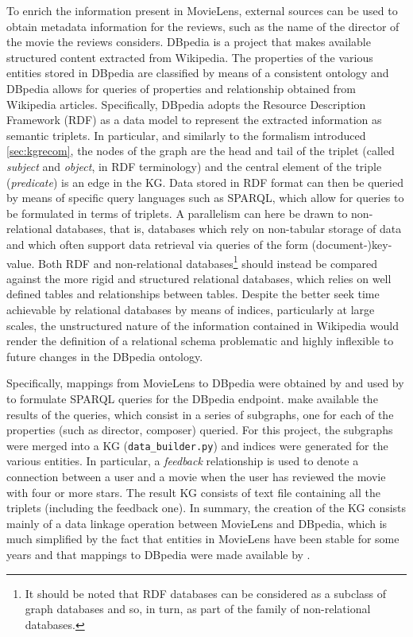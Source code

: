 To enrich the information present in MovieLens, external sources can be used to obtain metadata information for the reviews, such as the name of the director of the movie the reviews considers.
DBpedia \parencite{auer2007dbpedia} is a project that makes available structured  content extracted from Wikipedia.
The properties of the various entities stored in DBpedia are classified by means of a consistent ontology and DBpedia allows for queries of properties and relationship obtained from Wikipedia articles.
Specifically, DBpedia adopts the Resource Description Framework (RDF) as a data model to represent the extracted information as semantic triplets.
In particular, and similarly to the formalism introduced \cref{sec:kgrecom}, the nodes of the graph are the head and tail of the triplet (called \emph{subject} and \emph{object}, in RDF terminology) and the central element of the triple (\emph{predicate}) is an edge in the KG.
Data stored in RDF format can then be queried by means of specific query languages such as SPARQL, which allow for queries to be formulated in terms of triplets.
A parallelism can here be drawn to non-relational databases, that is, databases which rely on non-tabular storage of data and which often support data retrieval via queries of the form (document-)key-value.
Both RDF and non-relational databases\footnote{It should be noted that RDF databases can be considered as a subclass of graph databases and so, in turn, as part of the family of non-relational databases.} should instead be compared against the more rigid and structured relational databases, which relies on well defined tables and relationships between tables.
Despite the better seek time achievable by relational databases by means of indices, particularly at large scales, the unstructured nature of the information contained in Wikipedia would render the definition of a relational schema problematic and highly inflexible to future changes in the DBpedia ontology. 

Specifically, mappings  from MovieLens to DBpedia were obtained by \cite{ostuni2013top} and used by \cite{palumbo2017entity2rec} to formulate SPARQL queries for the DBpedia endpoint.
\cite{palumbo2017entity2rec} make available the results of the queries, which consist in a series of subgraphs, one for each of the properties (such as director, composer) queried.
For this project, the subgraphs were merged into a KG (\texttt{data\_builder.py}) and indices were generated for the various entities.
In particular, a \emph{feedback} relationship is used to denote a connection between a user and a movie when the user has reviewed the movie with four or more stars.
The result KG consists of text file containing all the triplets (including the feedback one).
In summary, the creation of the KG consists mainly of a data linkage operation between MovieLens and DBpedia, which is much simplified by the fact that entities in MovieLens have been stable for some years and that mappings to DBpedia were made available by \cite{ostuni2013top}.





